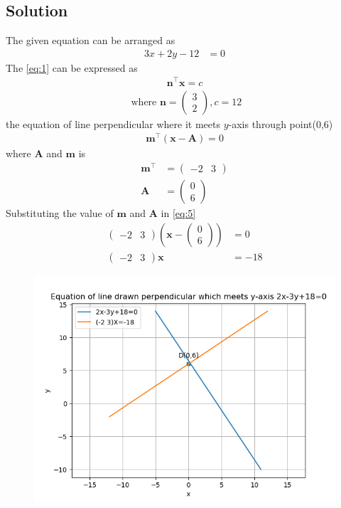 \documentclass[12pt]{article}
\providecommand{\brak}[1]{\ensuremath{\left(#1\right)}}
\newcommand{\myvec}[1]{\ensuremath{\begin{pmatrix}#1\end{pmatrix}}}
\let\vec\mathbf
\begin{document}
\begin{enumerate}
\section{Solution} The given equation can be arranged as
\begin{align}
3x+2y-12&=0 \label{eq:1}
\end{align}
The \eqref{eq:1} can be expressed as  
\begin{align}
	\vec{n}^{\top}\vec{x}=c
\end{align}
\begin{align}
	\text{ where }
		\vec{n} = \myvec{3\\2}, c=12 
\end{align}
the equation of line perpendicular where it meets $y$-axis through point(0,6)
\begin{align}
	\vec{m}^\top\brak{\vec{x}-\vec{A}}=0\label{eq:5}
\end{align}
		where $\vec{A}$ and $\vec{m}$ is 
\begin{align}
	\vec{m}^{\top} &=\myvec{-2 & 3}\\
	\vec{A} &=\myvec{0\\6}
\end{align}
Substituting the value of $\vec{m}$ and $\vec{A}$ in \eqref{eq:5}
		\begin{align}
			\myvec{-2 & 3}\brak{\vec{x}-\myvec{0\\6}} &=0\\
			\myvec{-2 & 3}\vec{x} &=-18
		\end{align}
\begin{figure}[h]
\includegraphics[width=\columnwidth]{figs/fig.png}
\caption{}
  \label{fig:Figure}
\end{figure}
\end{enumerate}
\end{document}
